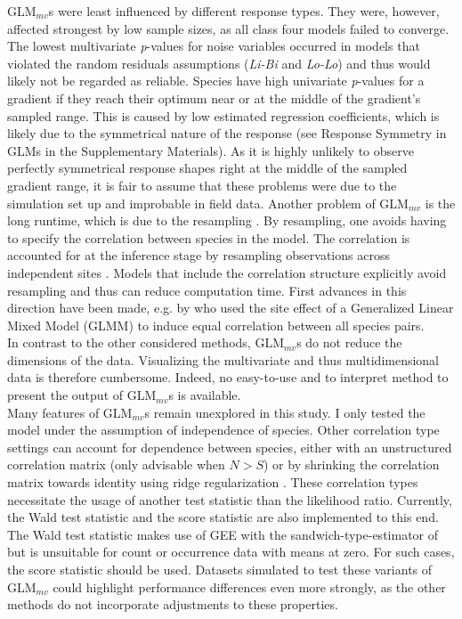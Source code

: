 	GLM$_{mv}$s were least influenced by different response types. 
	They were, however, affected strongest by low sample sizes, as all class four models failed to converge.
	The lowest multivariate \textit{p}-values for noise variables occurred in models that violated the random residuals assumptions (\textit{Li-Bi} and \textit{Lo-Lo}) and thus would likely not be regarded as reliable.
	Species have high univariate \textit{p}-values for a gradient if they reach their optimum near or at the middle of the gradient's sampled range.
	This is caused by low estimated regression coefficients, which is likely due to the symmetrical nature of the response (see Response Symmetry in GLMs in the Supplementary Materials).
	As it is highly unlikely to observe perfectly symmetrical response shapes right at the middle of the sampled gradient range, it is fair to assume that these problems were due to the simulation set up and improbable in field data.  
	Another problem of GLM$_{mv}$ is the long runtime, which is due to the resampling \citep{Wang2012}.
	By resampling, one avoids having to specify the correlation between species in the model.
	The correlation is accounted for at the inference stage by resampling observations across independent sites \citep{anderson2001new}. 
	Models that include the correlation structure explicitly avoid resampling and thus can reduce computation time.
	First advances in this direction have been made, e.g. by \citet{Jamil2012} who used the site effect of a Generalized Linear Mixed Model (GLMM) to induce equal correlation between all species pairs.\\
	In contrast to the other considered methods, GLM$_{mv}$s do not reduce the dimensions of the data. 
	Visualizing the multivariate and thus multidimensional data is therefore cumbersome.
	Indeed, no easy-to-use and to interpret method to present the output of GLM$_{mv}$s is available. \\
	Many features of GLM$_{mv}$s remain unexplored in this study. 
	I only tested the model under the assumption of independence of species.
	Other correlation type settings can account for dependence between species, either with an unstructured correlation matrix (only advisable when $N>S$) or by shrinking the correlation matrix towards identity using ridge regularization \citep{warton2008penalized}.
	These correlation types necessitate the usage of another test statistic than the likelihood ratio. 
	Currently, the Wald test statistic and the score statistic are also implemented to this end.
	The Wald test statistic makes use of GEE with the sandwich-type-estimator of \citet{Warton2011a} but is unsuitable for count or occurrence data with means at zero. 
	For such cases, the score statistic should be used. 
	Datasets simulated to test these variants of GLM$_{mv}$ could highlight performance differences even more strongly, as the other methods do not incorporate adjustments to these properties. \\

